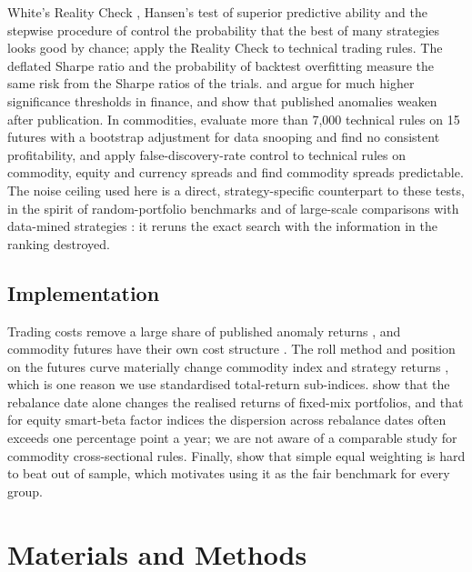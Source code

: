 \documentclass[commodities,article,submit,pdftex,moreauthors]{Definitions/mdpi}
\begin{document}
White's Reality Check \citep{white2000}, Hansen's test of superior predictive ability \citep{hansen2005} and the stepwise procedure of \citet{romano2005} control the probability that the best of many strategies looks good by chance; \citet{sullivan1999} apply the Reality Check to technical trading rules. The deflated Sharpe ratio \citep{bailey2014} and the probability of backtest overfitting \citep{bailey2017} measure the same risk from the Sharpe ratios of the trials. \citet{harvey2016} and \citet{harvey2015} argue for much higher significance thresholds in finance, and \citet{mclean2016} show that published anomalies weaken after publication. In commodities, \citet{marshall2008} evaluate more than 7,000 technical rules on 15 futures with a bootstrap adjustment for data snooping and find no consistent profitability, and \citet{psaradellis2023} apply false-discovery-rate control to technical rules on commodity, equity and currency spreads and find commodity spreads predictable. The noise ceiling used here is a direct, strategy-specific counterpart to these tests, in the spirit of random-portfolio benchmarks \citep{arnott2013} and of large-scale comparisons with data-mined strategies \citep{chordia2020}: it reruns the exact search with the information in the ranking destroyed.

\subsection{Implementation}

Trading costs remove a large share of published anomaly returns \citep{novymarx2016}, and commodity futures have their own cost structure \citep{marshall2012}. The roll method and position on the futures curve materially change commodity index and strategy returns \citep{mouakhar2010,degroot2014}, which is one reason we use standardised total-return sub-indices. \citet{hoffstein2019} show that the rebalance date alone changes the realised returns of fixed-mix portfolios, and \citet{hoffstein2020} that for equity smart-beta factor indices the dispersion across rebalance dates often exceeds one percentage point a year; we are not aware of a comparable study for commodity cross-sectional rules. Finally, \citet{demiguel2009} show that simple equal weighting is hard to beat out of sample, which motivates using it as the fair benchmark for every group.

\section{Materials and Methods}\label{sec:data}
\end{document}
